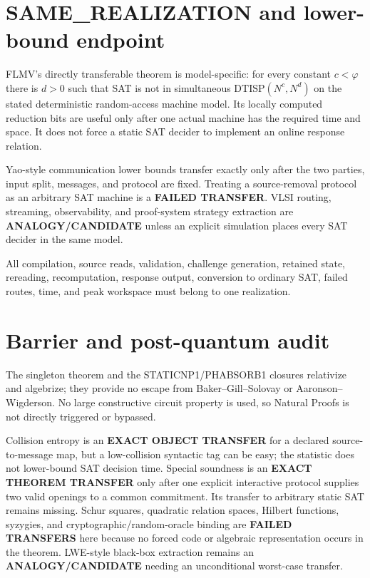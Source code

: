 \documentclass[11pt]{article}
\begin{document}
\section{SAME\_REALIZATION and lower-bound endpoint}

FLMV's directly transferable theorem is model-specific: for every constant
$c<\varphi$ there is $d>0$ such that SAT is not in simultaneous
$\mathrm{DTISP}(N^c,N^d)$ on the stated deterministic random-access machine
model.  Its locally computed reduction bits are useful only after one actual
machine has the required time and space.  It does not force a static SAT
decider to implement an online response relation.

Yao-style communication lower bounds transfer exactly only after the two
parties, input split, messages, and protocol are fixed.  Treating a
source-removal protocol as an arbitrary SAT machine is a \textbf{FAILED
TRANSFER}.  VLSI routing, streaming, observability, and proof-system strategy
extraction are \textbf{ANALOGY/CANDIDATE} unless an explicit simulation
places every SAT decider in the same model.

All compilation, source reads, validation, challenge generation, retained
state, rereading, recomputation, response output, conversion to ordinary SAT,
failed routes, time, and peak workspace must belong to one realization.

\section{Barrier and post-quantum audit}

The singleton theorem and the STATICNP1/PHABSORB1 closures relativize and
algebrize; they provide no escape from Baker--Gill--Solovay or
Aaronson--Wigderson.  No large constructive circuit property is used, so
Natural Proofs is not directly triggered or bypassed.

Collision entropy is an \textbf{EXACT OBJECT TRANSFER} for a declared
source-to-message map, but a low-collision syntactic tag can be easy; the
statistic does not lower-bound SAT decision time.  Special soundness is an
\textbf{EXACT THEOREM TRANSFER} only after one explicit interactive protocol
supplies two valid openings to a common commitment.  Its transfer to arbitrary
static SAT remains missing.  Schur squares, quadratic relation spaces,
Hilbert functions, syzygies, and cryptographic/random-oracle binding are
\textbf{FAILED TRANSFERS} here because no forced code or algebraic
representation occurs in the theorem.  LWE-style black-box extraction remains
an \textbf{ANALOGY/CANDIDATE} needing an unconditional worst-case transfer.
\end{document}
